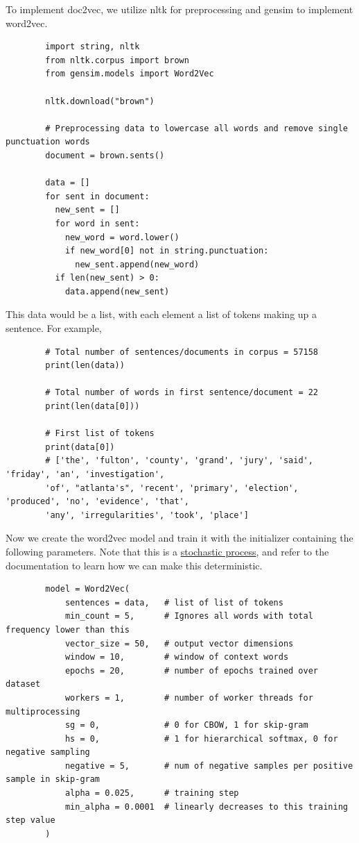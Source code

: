 \documentclass{article}
\begin{document}
      To implement doc2vec, we utilize nltk for preprocessing and gensim to implement word2vec. 
      \begin{lstlisting}
        import string, nltk
        from nltk.corpus import brown
        from gensim.models import Word2Vec
         
        nltk.download("brown")

        # Preprocessing data to lowercase all words and remove single punctuation words
        document = brown.sents()

        data = []
        for sent in document:
          new_sent = []
          for word in sent:
            new_word = word.lower()
            if new_word[0] not in string.punctuation:
              new_sent.append(new_word)
          if len(new_sent) > 0:
            data.append(new_sent)
      \end{lstlisting}
      This data would be a list, with each element a list of tokens making up a sentence. For example, 
      \begin{lstlisting}
        # Total number of sentences/documents in corpus = 57158
        print(len(data))

        # Total number of words in first sentence/document = 22
        print(len(data[0]))

        # First list of tokens 
        print(data[0])
        # ['the', 'fulton', 'county', 'grand', 'jury', 'said', 'friday', 'an', 'investigation', 
        'of', "atlanta's", 'recent', 'primary', 'election', 'produced', 'no', 'evidence', 'that', 
        'any', 'irregularities', 'took', 'place']
      \end{lstlisting}
      Now we create the word2vec model and train it with the initializer containing the following parameters. Note that this is a \hyperref[sp-def:stochastic-process]{stochastic process}, and refer to the documentation to learn how we can make this deterministic. 
      \begin{lstlisting}
        model = Word2Vec(
            sentences = data,   # list of list of tokens 
            min_count = 5,      # Ignores all words with total frequency lower than this
            vector_size = 50,   # output vector dimensions
            window = 10,        # window of context words 
            epochs = 20,        # number of epochs trained over dataset 
            workers = 1,        # number of worker threads for multiprocessing
            sg = 0,             # 0 for CBOW, 1 for skip-gram
            hs = 0,             # 1 for hierarchical softmax, 0 for negative sampling
            negative = 5,       # num of negative samples per positive sample in skip-gram
            alpha = 0.025,      # training step
            min_alpha = 0.0001  # linearly decreases to this training step value 
        )
      \end{lstlisting}
\end{document}
